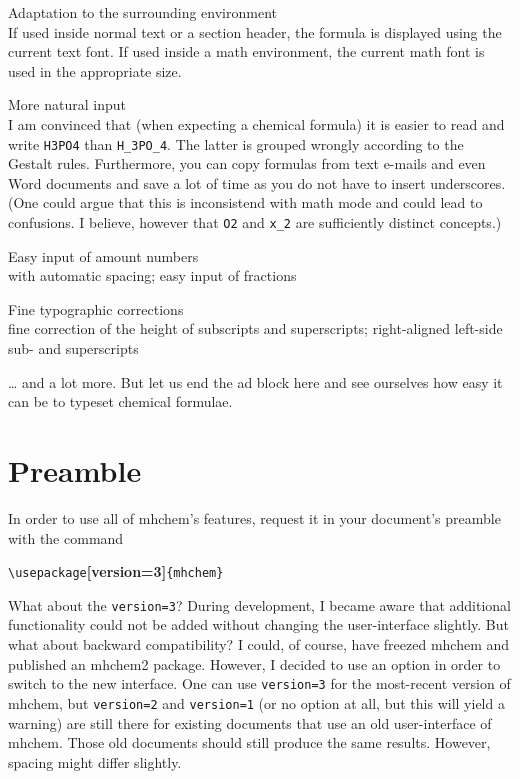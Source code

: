 \documentclass[a4paper,notitlepage]{scrreprt}
\newenvironment{annotation}{\bgroup\footnotesize}{\par\egroup}
\begin{document}
\begin{compactitem}
  \item Adaptation to the surrounding environment\\
	If used inside normal text or a section header, the formula is displayed using the current text font. If used inside a math environment, the current math font is used in the appropriate size.
  
  \item More natural input\\
  I am convinced that (when expecting a chemical formula) it is easier to read and write \verb|H3PO4| than \verb|H_3PO_4|. The latter is grouped wrongly according to the Gestalt rules. Furthermore, you can copy formulas from text e-mails and even Word documents and save a lot of time as you do not have to insert underscores. (One could argue that this is inconsistend with math mode and could lead to confusions. I believe, however that \verb|O2| and \verb|x_2| are sufficiently distinct concepts.)
  
  \item Easy input of amount numbers\\
  with automatic spacing; easy input of fractions
  
  \item Fine typographic corrections\\
  fine correction of the height of subscripts and superscripts; right-aligned left-side sub- and superscripts
\end{compactitem}

\noindent
\ldots{} and a lot more. But let us end the ad block here and see ourselves how easy it can be to typeset chemical formulae.


\section{Preamble}

\noindent
In order to use all of mhchem's features, request it in your document's preamble with the command

\smallskip

{\Large\verb|\usepackage|{\ttfamily\bfseries [version=3]}\verb|{mhchem}|}
\marginpar{\Large !}

\medskip

\begin{annotation}
\noindent
What about the \verb|version=3|? During development, I became aware that additional functionality could not be added without changing the user-interface slightly. But what about backward compatibility? I could, of course, have freezed mhchem and published an mhchem2 package. However, I decided to use an option in order to switch to the new interface. One can use \verb|version=3| for the most-recent version of mhchem, but \verb|version=2| and \verb|version=1| (or no option at all, but this will yield a warning) are still there for existing documents that use an old user-interface of mhchem. Those old documents should still produce the same results. However, spacing might differ slightly.
\end{annotation}
\end{document}
